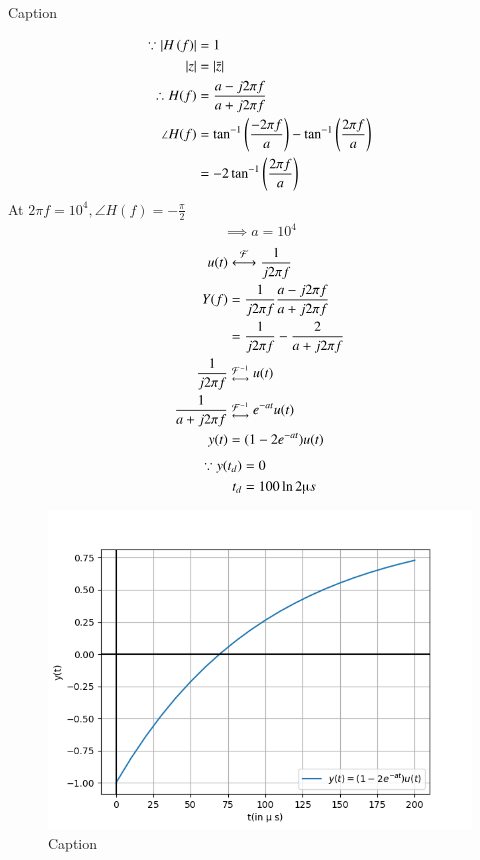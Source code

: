 \documentclass[journal,12pt,twocolumn]{IEEEtran}
\theoremstyle{remark}
\begin{document}
\solution 
\begin{table}[!h]
    \centering
    
    \caption{Caption}
    \label{tab:my_label}
\end{table}
\begin{align}
    \because \left\vert H\left(f\right)\right\vert &= 1\\
    \left\vert z\right\vert &= \left\vert\bar{z}\right\vert\\
    \therefore H(f) &= \frac{a - j2\pi f}{a + j2\pi f}\\
    \angle {H(f)} &= \tan^{-1}\left(\frac{-2\pi f}{a}\right) - \tan^{-1}\left(\frac{2\pi f}{a}\right)\\
    &= -2 \tan^{-1}\left(\frac{2\pi f}{a}\right)
\end{align}
At $2\pi f = 10^4, \angle{H(f)} = -\frac{\pi}{2}$
\begin{align}
    \implies a = 10^4 
\end{align}
\begin{align}
    u(t) &\system{\mathcal{F}} \frac{1}{j2\pi f}\\
    Y(f) &= \frac{1}{j2\pi f} \frac{a - j2\pi f}{a + j2\pi f}\\
    &= \frac{1}{j2\pi f} - \frac{2}{a + j2\pi f}\\
    \frac{1}{j2\pi f} &\mathrel{\substack{\mathcal{F}^{-1}\\\longleftrightarrow}} u(t)\\
    \frac{1}{a + j2\pi f} &\mathrel{\substack{\mathcal{F}^{-1}\\\longleftrightarrow}} e^{-at} u(t) \\
    y(t) &= (1-2e^{-at}) u(t)
\end{align}
\begin{align}
    \because y(t_d) &= 0 \\
    t_d &= 100 \ln{2} \micro s 
\end{align}
\begin{figure}[!h]
    \centering
    \includegraphics[width=\columnwidth]{figs/graph.png}
    \caption{Caption}
    \label{fig:enter-label}
\end{figure}
\end{document}
